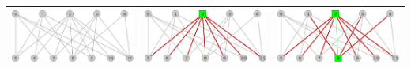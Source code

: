 \begin{center}
\begin{tabular}{ |c||c||c| }
			\hline
			\includegraphics[scale = 0.2]{img/ej3/constructiva_golosa/bipartito1_st0.png} &
			\includegraphics[scale = 0.2]{img/ej3/constructiva_golosa/bipartito1_st01.png} &
			\includegraphics[scale = 0.2]{img/ej3/constructiva_golosa/bipartito1_st02.png} \\
			\hline
		\end{tabular}
	\end{center}

